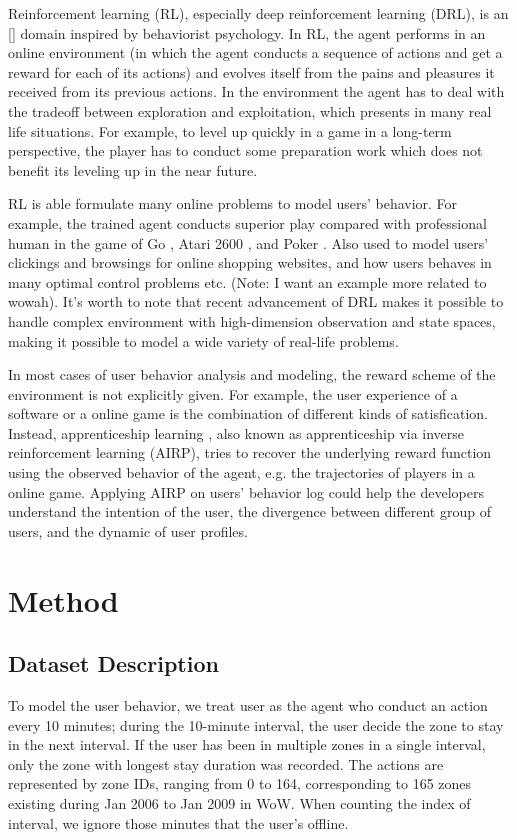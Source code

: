 \documentclass[a4paper]{article}
\begin{document}
Reinforcement learning (RL), especially deep reinforcement learning (DRL), is an [] domain  inspired by behaviorist psychology. In RL, the agent performs in an online environment (in which the agent conducts a sequence of actions and get a reward for each of its actions) and evolves itself from the pains and pleasures it received from its previous actions. In the environment the agent has to deal with the tradeoff between exploration and exploitation, which presents in many real life situations. For example, to level up quickly in a game in a long-term perspective, the player has to conduct some preparation work which does not benefit its leveling up in the near future.

RL is able formulate many online problems to model users' behavior. For example, the trained agent conducts superior play compared with professional human in the game of Go \cite{}, Atari 2600 \cite{}, and Poker \cite{}. Also used to model users' clickings and browsings for online shopping websites, and how users behaves in many optimal control problems etc. (Note: I want an example more related to wowah). It's worth to note that recent advancement of DRL makes it possible to handle complex environment with high-dimension observation and state spaces, making it possible to model a wide variety of real-life problems.

In most cases of user behavior analysis and modeling, the reward scheme of the environment is not explicitly given. For example, the user experience of a software or a online game is the combination of different kinds of satisfication. Instead, apprenticeship learning \cite{}, also known as apprenticeship via inverse reinforcement learning (AIRP), tries to recover the underlying reward function using the observed behavior of the agent, e.g. the trajectories of players in a online game. Applying AIRP on users' behavior log could help the developers understand the intention of the user, the divergence between different group of users, and the dynamic of user profiles. 

\section{Method}

\subsection{Dataset Description}

To model the user behavior, we treat user as the agent who conduct an action every 10 minutes; during the 10-minute interval, the user decide the zone to stay in the next interval. If the user has been in multiple zones in a single interval, only the zone with longest stay duration was recorded. The actions are represented by zone IDs, ranging from 0 to 164, corresponding to 165 zones existing during Jan 2006 to Jan 2009 in WoW. When counting the index of interval, we ignore those minutes that the user's offline.
\end{document}
